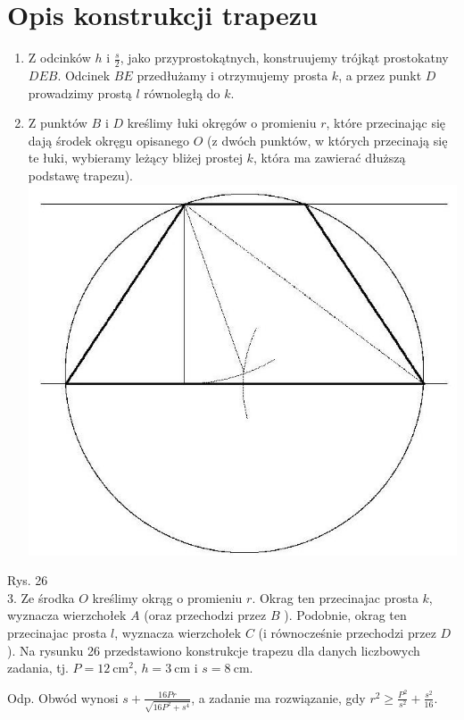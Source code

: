 \documentclass[10pt]{article}
\begin{document}
\section*{Opis konstrukcji trapezu}
\begin{enumerate}
  \item Z odcinków $h$ i $\frac{s}{2}$, jako przyprostokątnych, konstruujemy trójkąt prostokatny $D E B$. Odcinek $B E$ przedłużamy i otrzymujemy prosta $k$, a przez punkt $D$ prowadzimy prostą $l$ równoległą do $k$.
  \item Z punktów $B$ i $D$ kreślimy łuki okrẹgów o promieniu $r$, które przecinając się dają środek okręgu opisanego $O$ (z dwóch punktów, w których przecinają się te łuki, wybieramy leżący bliżej prostej $k$, która ma zawierać dłuższą podstawę trapezu).\\
\includegraphics[max width=\textwidth, center]{2024_11_16_fe5b564401bf7db98894g-121}
\end{enumerate}

Rys. 26\\
3. Ze środka $O$ kreślimy okrąg o promieniu $r$. Okrag ten przecinajac prosta $k$, wyznacza wierzchołek $A$ (oraz przechodzi przez $B$ ). Podobnie, okrag ten przecinajac prosta $l$, wyznacza wierzchołek $C$ (i równocześnie przechodzi przez $D$ ). Na rysunku 26 przedstawiono konstrukcje trapezu dla danych liczbowych zadania, tj. $P=12 \mathrm{~cm}^{2}$, $h=3 \mathrm{~cm}$ i $s=8 \mathrm{~cm}$.

Odp. Obwód wynosi $s+\frac{16 P r}{\sqrt{16 P^{2}+s^{4}}}$, a zadanie ma rozwiązanie, gdy $r^{2} \geq \frac{P^{2}}{s^{2}}+\frac{s^{2}}{16}$.
\end{document}
